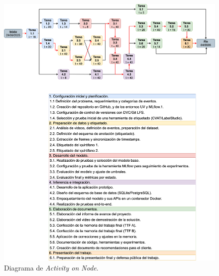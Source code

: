 \documentclass[
11pt, %
]{charter}
\begin{document}
\begin{figure}[htpb]
\centering 
\includegraphics[width=1\textwidth]{./Figuras/CEIA-GDP-Esquema-AoN.table.png}
\caption{Diagrama de \textit{Activity on Node}.}
\label{fig:AoN}
\end{figure}
\end{document}

